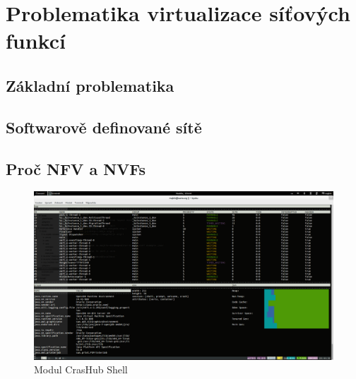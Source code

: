 \chapter{Problematika virtualizace síťových funkcí}



\section{Základní problematika}\label{sub:interaction}

\section{Softwarově definované sítě}\label{sub:interaction}

\section{Proč NFV a NVFs}\label{sub:interaction}


\begin{figure}[h]
\begin{centering}
\includegraphics[scale=0.21]{images/real_interaction}
\par\end{centering}
\caption{Modul CrasHub Shell\label{fig:real_interaction}}
\end{figure}
